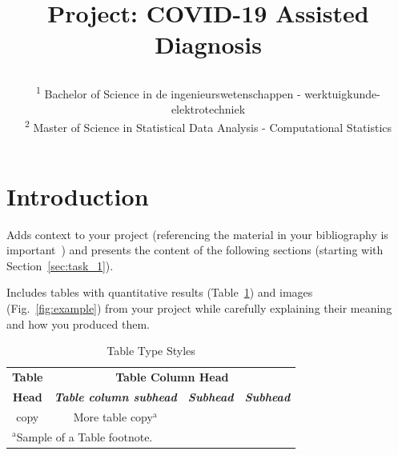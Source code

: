\documentclass[conference]{IEEEtran}
\begin{document}
\title{Project: COVID-19 Assisted Diagnosis\\


\author{
\and
{}
\and
{}
\and
{}
\and

\textsuperscript{1} Bachelor of Science in de ingenieurswetenschappen - werktuigkunde-elektrotechniek \hfill\\
\textsuperscript{2} Master of Science in Statistical Data Analysis - Computational Statistics\hfill\\}
}
\maketitle



\section{Introduction}
Adds context to your project (referencing the material in your bibliography is important~\cite{b1, b2}) and presents the content of the following sections (starting with Section~\ref{sec:task_1}).

Includes tables with quantitative results (Table~\ref{table:example}) and images (Fig.~\ref{fig:example}) from your project while carefully explaining their meaning and how you produced them.
\begin{table}[htbp]
\caption{Table Type Styles}
\begin{center}
\begin{tabular}{|c|c|c|c|}
\hline
\textbf{Table}&\multicolumn{3}{|c|}{\textbf{Table Column Head}} \\
\cline{2-4} 
\textbf{Head} & \textbf{\textit{Table column subhead}}& \textbf{\textit{Subhead}}& \textbf{\textit{Subhead}} \\
\hline
copy& More table copy$^{\mathrm{a}}$& &  \\
\hline
\multicolumn{4}{l}{$^{\mathrm{a}}$Sample of a Table footnote.}
\end{tabular}
\label{table:example}
\end{center}
\end{table}
\end{document}
